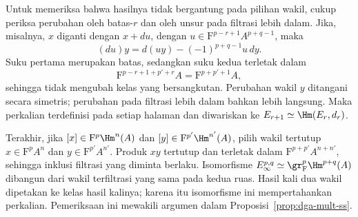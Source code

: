 Untuk memeriksa bahwa hasilnya tidak bergantung pada pilihan wakil, cukup periksa perubahan oleh batas-$r$ dan
oleh unsur pada filtrasi lebih dalam. Jika, misalnya, $x$ diganti dengan
$x+du$, dengan
$u\in\mathrm{F}^{p-r+1}A^{p+q-1}$, maka
\[
	(du)y=d(uy)-(-1)^{p+q-1}u\,dy.
\]
Suku pertama merupakan batas, sedangkan suku kedua terletak dalam
\[
	\mathrm{F}^{p-r+1+p'+r}A
	=\mathrm{F}^{p+p'+1}A,
\]
sehingga tidak mengubah kelas yang bersangkutan. Perubahan wakil $y$
ditangani secara simetris; perubahan pada filtrasi lebih dalam bahkan lebih
langsung. Maka perkalian terdefinisi pada setiap halaman dan diwariskan ke
$E_{r+1}\simeq\Hm(E_r,d_r)$.

Terakhir, jika $[x]\in\mathrm{F}^p\Hm^n(A)$ dan
$[y]\in\mathrm{F}^{p'}\Hm^{n'}(A)$, pilih wakil tertutup
$x\in\mathrm{F}^pA^n$ dan $y\in\mathrm{F}^{p'}A^{n'}$. Produk $xy$ tertutup
dan terletak dalam $\mathrm{F}^{p+p'}A^{n+n'}$, sehingga inklusi filtrasi
yang diminta berlaku. Isomorfisme
$E_\infty^{p,q}\simeq\gr^p_{\mathrm F}\Hm^{p+q}(A)$ dibangun dari
wakil terfiltrasi yang sama pada kedua ruas. Hasil kali dua wakil dipetakan ke
kelas hasil kalinya; karena itu isomorfisme ini mempertahankan
perkalian. Pemeriksaan ini mewakili argumen dalam
Proposisi~\ref{prop:dga-mult-ss}.
